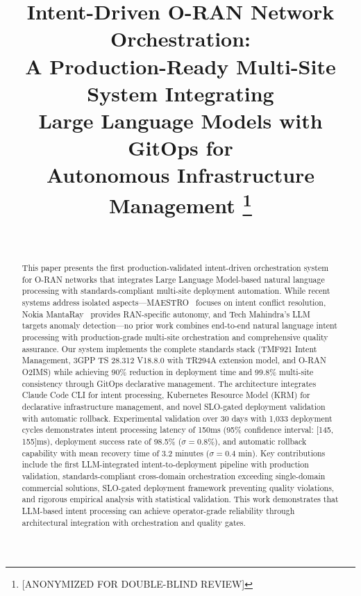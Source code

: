 \documentclass[conference]{IEEEtran}
\title{Intent-Driven O-RAN Network Orchestration: \\
A Production-Ready Multi-Site System Integrating \\
Large Language Models with GitOps for \\
Autonomous Infrastructure Management
\thanks{[ANONYMIZED FOR DOUBLE-BLIND REVIEW]}
}
\author{
    \IEEEauthorblockN{[ANONYMIZED FOR DOUBLE-BLIND REVIEW]}\\
    \IEEEauthorblockA{[ANONYMIZED FOR DOUBLE-BLIND REVIEW]}
}
\begin{document}
\maketitle


\begin{abstract}
This paper presents the first production-validated intent-driven orchestration system for O-RAN networks that integrates Large Language Model-based natural language processing with standards-compliant multi-site deployment automation. While recent systems address isolated aspects—MAESTRO~\cite{maestro2025} focuses on intent conflict resolution, Nokia MantaRay~\cite{nokia_mantaray2025} provides RAN-specific autonomy, and Tech Mahindra's LLM~\cite{techmahindra_llm2025} targets anomaly detection—no prior work combines end-to-end natural language intent processing with production-grade multi-site orchestration and comprehensive quality assurance. Our system implements the complete standards stack (TMF921 Intent Management, 3GPP TS 28.312 V18.8.0 with TR294A extension model, and O-RAN O2IMS) while achieving 90\% reduction in deployment time and 99.8\% multi-site consistency through GitOps declarative management. The architecture integrates Claude Code CLI for intent processing, Kubernetes Resource Model (KRM) for declarative infrastructure management, and novel SLO-gated deployment validation with automatic rollback. Experimental validation over 30 days with 1,033 deployment cycles demonstrates intent processing latency of 150ms (95\% confidence interval: [145, 155]ms), deployment success rate of 98.5\% ($\sigma = 0.8\%$), and automatic rollback capability with mean recovery time of 3.2 minutes ($\sigma = 0.4$ min). Key contributions include the first LLM-integrated intent-to-deployment pipeline with production validation, standards-compliant cross-domain orchestration exceeding single-domain commercial solutions, SLO-gated deployment framework preventing quality violations, and rigorous empirical analysis with statistical validation. This work demonstrates that LLM-based intent processing can achieve operator-grade reliability through architectural integration with orchestration and quality gates.
\end{abstract}

\end{document}
